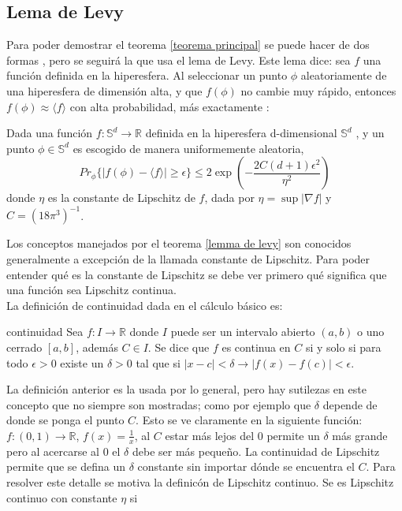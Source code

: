 \subsection{Lema de Levy} \label{ levy}
Para poder demostrar el teorema \ref{teorema principal} se puede hacer de dos formas \cite{Popescu2006}, pero se seguirá la que usa el lema de Levy. Este lema dice: sea $f$ una función definida en la hiperesfera. Al seleccionar un punto $\phi$ aleatoriamente de una hiperesfera de dimensión alta, y que $f(\phi)$ no cambie muy rápido, entonces $f(\phi) \approx \langle f \rangle $ con alta probabilidad, más exactamente  \cite{Lema}:
\\
\begin{lemma} \label{lemma de levy}

Dada una función $f: \mathbb{S}^d \to \mathbb{R} $ definida en la hiperesfera d-dimensional $\mathbb{S}^d$ , y un punto $\phi \in \mathbb{S}^d $ es escogido de manera uniformemente aleatoria,
\begin{equation}
Pr_{\phi} \{ |f(\phi)- \langle f \rangle| \geq \epsilon \} \leq 2 \exp(-\frac{2C(d+1)\epsilon^2}{\eta^2})
\end{equation}
donde $\eta$ es la constante de Lipschitz de $f$, dada por $\eta= \sup|\nabla f|$ y $C=(18 \pi^3)^{-1} $.\\

\end{lemma}

Los conceptos manejados por el teorema \ref{lemma de levy} son conocidos generalmente a excepción de la llamada constante de Lipschitz. Para poder entender qué es la  constante de Lipschitz se debe ver primero qué significa que una función sea Lipschitz continua. 
\\
La definición de continuidad dada en el cálculo básico es:

\theoremstyle{definition}
\begin{definition}{continuidad}
Sea $f: I \to \mathbb{R}$ donde $I$ puede ser un intervalo abierto $(a,b)$ o uno cerrado $[a,b]$, además $C \in I$. Se dice que $f$ es continua en $C$ si y solo si para todo $ \epsilon >0 $  existe un $ \delta >0 $ tal que si $ |x-c| < \delta \longrightarrow |f(x)-f(c)|< \epsilon $.
\end{definition} 

La  definición anterior es la usada por lo general, pero hay sutilezas en este concepto que no siempre son mostradas; como por ejemplo que $\delta$ depende de donde se ponga el punto $C$. Esto se ve claramente en la siguiente función: $f: (0,1) \to \mathbb{R}$, $f(x)=\frac{1}{x} $, al $C$ estar más lejos del $0$ permite un $\delta$ más grande pero al acercarse al $0$ el $\delta$ debe ser más pequeño. La continuidad de Lipschitz permite que se defina un $\delta$ constante sin importar dónde se encuentra el $C$. Para resolver este detalle se motiva la definicón de Lipschitz continuo. Se es Lipschitz continuo con constante $\eta$ si

